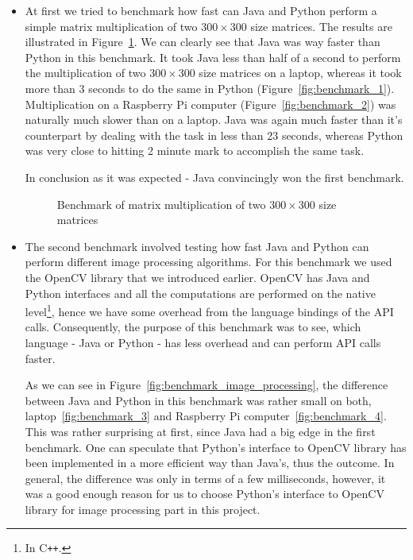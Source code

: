 \begin{itemize}
\item At first we tried to benchmark how fast can Java and Python perform a simple matrix multiplication of two $300 \times 300$ size matrices. The results are illustrated in Figure~\ref{fig:benchmark_multiplication}. We can clearly see that Java was way faster than Python in this benchmark. It took Java less than half of a second to perform the multiplication of two $300 \times 300$ size matrices on a laptop, whereas it took more than 3 seconds to do the same in Python (Figure~\ref{fig:benchmark_1}). Multiplication on a Raspberry Pi computer (Figure~\ref{fig:benchmark_2}) was naturally much slower than on a laptop. Java was again much faster than it's counterpart by dealing with the task in less than 23 seconds, whereas Python was very close to hitting 2 minute mark to accomplish the same task.

In conclusion as it was expected - Java convincingly won the first benchmark.

\begin{figure}[ht]
		\centering
		\quad
		\caption{Benchmark of matrix multiplication of two $300 \times 300$ size matrices}
		\label{fig:benchmark_multiplication}
\end{figure}

\item The second benchmark involved testing how fast Java and Python can perform different image processing algorithms. For this benchmark we used the OpenCV library that we introduced earlier. OpenCV has Java and Python interfaces and all the computations are performed on the native level\footnote{In C\texttt{++}.}, hence we have some overhead from the language bindings of the API calls. Consequently, the purpose of this benchmark was to see, which language - Java or Python - has less overhead and can perform API calls faster. 

As we can see in Figure~\ref{fig:benchmark_image_processing}, the difference between Java and Python in this benchmark was rather small on both, laptop~\ref{fig:benchmark_3} and Raspberry Pi computer~\ref{fig:benchmark_4}. This was rather surprising at first, since Java had a big edge in the first benchmark. One can speculate that Python's interface to OpenCV library has been implemented in a more efficient way than Java's, thus the outcome. In general, the difference was only in terms of a few milliseconds, however, it was a good enough reason for us to choose Python's interface to OpenCV library for image processing part in this project.


\end{itemize}
